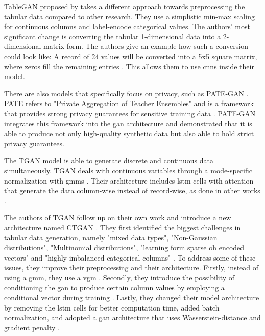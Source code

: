 TableGAN proposed by \cite{park2018DataSynthesisBased} takes a different approach towards preprocessing the tabular data compared to other research.
They use a simplistic min-max scaling for continuous columns and label-encode categorical values.
The authors' most significant change is converting the tabular 1-dimensional data into a 2-dimensional matrix form.
The authors give an example how such a conversion could look like:
A record of 24 values will be converted into a 5x5 square matrix, where zeros fill the remaining entries \cite[p-4]{park2018DataSynthesisBased}.
This allows them to use \glspl{cnn} inside their model.

There are also models that specifically focus on privacy, such as PATE-GAN  \cite{jordon2018PATEGANGeneratingSynthetic}.
PATE refers to "Private Aggregation of Teacher Ensembles" \cite{papernot2017SemisupervisedKnowledgeTransfer} and is a framework that provides strong privacy guarantees for sensitive training data \cite{jordon2018PATEGANGeneratingSynthetic}.
PATE-GAN integrates this framework into the \gls{gan} architecture and demonstrated that it is able to produce not only high-quality synthetic data but also able to hold strict privacy guarantees.

The TGAN \cite{xu2018SynthesizingTabularData} model is able to generate discrete and continuous data simultaneously.
TGAN deals with continuous variables through a mode-specific normalization with \glspl{gmm} \cite[p. 3]{xu2018SynthesizingTabularData}.
Their architecture includes \gls{lstm} cells with attention that generate the data column-wise instead of record-wise, as done in other works \cite{xu2018SynthesizingTabularData}.

The authors of TGAN follow up on their own work and introduce a new architecture named CTGAN \cite{xu2019ModelingTabularData}.
They first identified the biggest challenges in tabular data generation, namely "mixed data types", "Non-Gaussian distributions", "Multinomial distributions", "learning form sparse \gls{oh} encoded vectors" and "highly imbalanced categorical columns" \cite[p. 3]{xu2019ModelingTabularData}.
To address some of these issues, they improve their preprocessing and their architecture.
Firstly, instead of using a \acrfull{gmm}, they use a \acrfull{vgm} \cite{xu2019ModelingTabularData}.
Secondly, they introduce the possibility of conditioning the \gls{gan} to produce certain column values by employing a conditional vector during training \cite{xu2019ModelingTabularData}.
Lastly, they changed their model architecture by removing the \gls{lstm} cells for better computation time, added batch normalization, 
and adopted a \gls{gan} architecture that uses Wasserstein-distance and gradient penalty \cite{gulrajani2017ImprovedTrainingWasserstein}.


